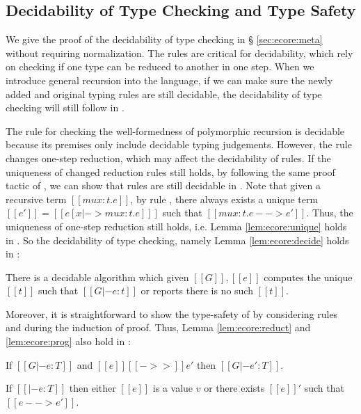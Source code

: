 \subsection{Decidability of Type Checking and Type Safety}
We give the proof of the decidability of type checking \ecore in \S
\ref{sec:ecore:meta} without requiring normalization. The \cast rules
are critical for decidability, which rely on checking if one type can
be reduced to another in one step. When we introduce general recursion
into the language, if we can make sure the newly added and original
typing rules are still decidable, the decidability of type checking
will still follow in \name.

The rule  for checking the well-formedness of
polymorphic recursion is decidable because its premises only include
decidable typing judgements. However, the rule  changes
one-step reduction, which may affect the decidability of \cast
rules. If the uniqueness of changed reduction rules still holds, by
following the same proof tactic of \ecore, we can show that \cast
rules are still decidable in \name. Note that given a recursive term
$[[mu x:t.e]]$, by rule , there always exists a unique
term $[[e']]=[[e[x|->mu x:t.e] ]]$ such that $[[mu x:t.e -->
    e']]$. Thus, the uniqueness of one-step reduction still holds,
i.e. Lemma \ref{lem:ecore:unique} holds in \name. So the decidability
of type checking, namely Lemma \ref{lem:ecore:decide} holds in \name:

\begin{lem}\label{lem:rec:decide}
	There is a decidable algorithm which given $[[G]], [[e]]$ computes the unique
$[[t]]$ such that $[[G |- e:t]]$ or reports there is no such $[[t]]$.
\end{lem}

Moreover, it is straightforward to show the type-safety of \name by
considering rules  and  during the
induction of proof. Thus, Lemma \ref{lem:ecore:reduct} and \ref{lem:ecore:prog}
also hold in \name:

\begin{lem}\label{lem:rec:reduct}
If $[[G |- e:T]]$ and $[[e]] [[->>]] e'$ then $[[G |- e':T]]$.
\end{lem}

\begin{lem}[Progress]\label{lem:rec:prog}
If $[[|- e:T]]$ then either $[[e]]$ is a value $v$ or there exists $[[e]]'$
such that $[[e --> e']]$.
\end{lem}
